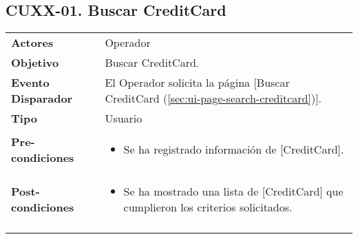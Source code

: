 	\subsection{CUXX-01. Buscar CreditCard} \label{sec:cu-search-CreditCard}
	
	\begin{tabular}{ p{3.5cm} p{11.5cm} }
		\textbf{Actores} & Operador\\
		\textbf{Objetivo} & Buscar CreditCard.\\
		\textbf{Evento Disparador} & El Operador solicita la p\'agina [Buscar CreditCard (\ref{sec:ui-page-search-creditcard})].\\
		\textbf{Tipo} & Usuario\\
		\textbf{Pre-condiciones} &
			\begin{minipage}[t]{0.6\textwidth}
			\begin{itemize}[noitemsep,nolistsep]
			\setlength{\itemindent}{-.5cm}
				\item Se ha registrado informaci\'on de [CreditCard].
			\end{itemize}
			\end{minipage} \\
		\textbf{Post-condiciones} &
			\begin{minipage}[t]{0.6\textwidth}
			\begin{itemize}[noitemsep,nolistsep]
			\setlength{\itemindent}{-.5cm}
				\item Se ha mostrado una lista de [CreditCard] que cumplieron los criterios solicitados.
			\end{itemize}
			\end{minipage} \\
		\\
	\end{tabular}
	
